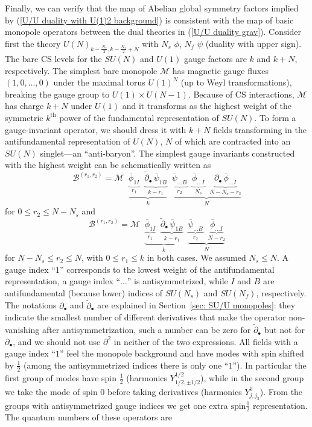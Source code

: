 \documentclass[a4paper, 12pt]{article}
\newcommand{\wb}{\overline}
\numberwithin{equation}{section}
\newcommand{\be}{\begin{equation}} \newcommand{\ee}{\end{equation}}
\newcommand{\cB}{\mathcal{B}}
\newcommand{\cM}{\mathcal{M}}
\begin{document}
Finally, we can verify that the map of Abelian global symmetry factors implied by (\ref{U/U duality with U(1)2 background}) is consistent with the map of basic monopole operators between the dual theories in (\ref{U/U duality grav}). Consider first the theory $U(N)_{k- \frac{N_f}2, k - \frac{N_f}2 + N}$ with $N_s$ $\phi$, $N_f$ $\psi$ (duality with upper sign). The bare CS levels for the $SU(N)$ and $U(1)$ gauge factors are $k$ and $k+N$, respectively. The simplest bare monopole $\cM$ has magnetic gauge fluxes $(1, 0, \dots ,0)$ under the maximal torus $U(1)^N$ (up to Weyl transformations), breaking the gauge group to $U(1) \times U(N-1)$. Because of CS interactions, $\cM$ has charge $k+N$ under $U(1)$ and it transforms as the highest weight of the symmetric $k^\text{th}$ power of the fundamental representation of $SU(N)$. To form a gauge-invariant operator, we should dress it with $k+N$ fields transforming in the antifundamental representation of $U(N)$, $N$ of which are contracted into an $SU(N)$ singlet---an ``anti-baryon''. The simplest gauge invariants constructed with the highest weight can be schematically written as
\be
\label{U monopoles 1}
\cB^{(r_1, r_2)} = \cM \;\; \underbrace{ \underbrace{\wb\phi_{1I}}_{r_1} \;\; \underbrace{\tilde\partial_\bullet \, \wb\psi_{1B}}_{k-r_1} }_{k} \;\; \underbrace{ \underbrace{\wb\psi_{\dots B}}_{r_2} \;\; \underbrace{ \wb\phi_{\dots I}}_{N_s} \;\; \underbrace{ \partial_\bullet\, \wb\phi_{\dots I}}_{N-N_s - r_2} }_N
\ee
for $0 \leq r_2 \leq N-N_s$ and
\be
\label{U monopoles 2}
\cB^{(r_1, r_2)} = \cM \;\; \underbrace{ \underbrace{\wb\phi_{1I}}_{r_1} \;\; \underbrace{\tilde\partial_\bullet \, \wb\psi_{1B}}_{k-r_1} }_{k} \;\; \underbrace{ \underbrace{\wb\psi_{\dots B}}_{r_2} \;\; \underbrace{ \wb\phi_{\dots I}}_{N - r_2} }_N
\ee
for $N-N_s \leq r_2 \leq N$, with $0\leq r_1 \leq k$ in both cases. We assumed $N_s \leq N$. A gauge index ``$1$'' corresponds to the lowest weight of the antifundamental representation, a gauge index ``$\dots$'' is antisymmetrized, while $I$ and $B$ are antifundamental (because lower) indices of $SU(N_s)$ and $SU(N_f)$, respectively. The notations $\partial_\bullet$ and $\tilde\partial_\bullet$ are explained in Section~\ref{sec: SU/U monopoles}: they indicate the smallest number of different derivatives that make the operator non-vanishing after antisymmetrization, such a number can be zero for $\tilde\partial_\bullet$ but not for $\partial_\bullet$, and we should not use $\partial^2$ in neither of the two expressions. All fields with a gauge index ``$1$'' feel the monopole background and have modes with spin shifted by $\frac12$ (among the antisymmetrized indices there is only one ``$1$''). In particular the first group of modes have spin $\frac12$ (harmonics $Y^{1/2}_{1/2,\pm1/2}$), while in the second group we take the mode of spin $0$ before taking derivatives (harmonics $Y^0_{j,j_3}$). From the groups with antisymmetrized gauge indices we get one extra $\text{spin}\frac12$ representation. The quantum numbers of these operators are
\end{document}
